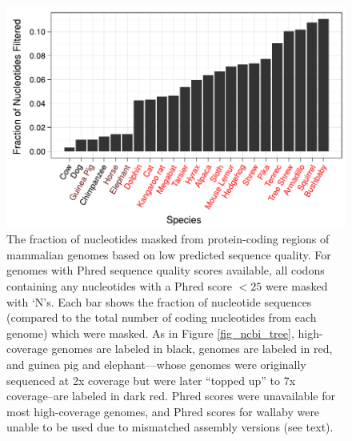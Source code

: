 
\begin{figure}
\centering
\includegraphics[scale=0.9]{Figs/qual_filter_hist.pdf}
\caption{The fraction of nucleotides masked from protein-coding
  regions of mammalian genomes based on low predicted sequence
  quality. For genomes with Phred sequence quality scores available,
  all codons containing any nucleotides with a Phred score $<25$ were
  masked with `N's. Each bar shows the fraction of nucleotide
  sequences (compared to the total number of coding nucleotides from
  each genome) which were masked. As in Figure \ref{fig_ncbi_tree},
  high-coverage genomes are labeled in black, \lcv genomes are labeled
  in red, and guinea pig and elephant---whose genomes were originally
  sequenced at 2x coverage but were later ``topped up'' to 7x
  coverage--are labeled in dark red. Phred scores were unavailable for
  most high-coverage genomes, and Phred scores for wallaby were unable
  to be used due to mismatched assembly versions (see text).}
\label{filtered_qual_bars}
\end{figure}

